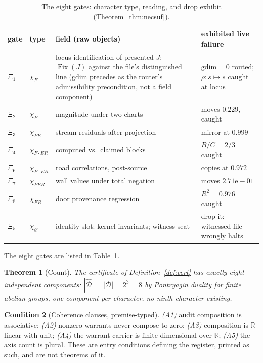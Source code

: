 \documentclass[twocolumn,10pt]{article}
\theoremstyle{plain}
\newtheorem{theorem}{Theorem}[section]
\theoremstyle{definition}
\newtheorem{condition}[theorem]{Condition}
\newcommand{\Rl}{\mathbb{R}}
\begin{document}
\begin{table}[t]\centering\small
\begin{tabular}{@{}llp{6.4cm}p{4.2cm}@{}}
\toprule
gate & type & field (raw objects) & exhibited live failure\\
\midrule
$\Xi_1$ & $\chi_F$ & locus identification of presented $J$: $\operatorname{Fix}(J)$ against the file's distinguished line ($\mathrm{gdim}$ precedes as the router's admissibility precondition, not a field component) & $\mathrm{gdim}=0$ routed; $\rho\colon s\mapsto\bar s$ caught at locus\\
$\Xi_2$ & $\chi_E$ & magnitude under two charts & moves $0.229$, caught\\
$\Xi_3$ & $\chi_{FE}$ & stream residuals after projection & mirror at $0.999$\\
$\Xi_4$ & $\chi_{F\cdot ER}$ & computed vs.\ claimed blocks & $B/C=2/3$ caught\\
$\Xi_6$ & $\chi_{E\cdot ER}$ & road correlations, post-source & copies at $0.972$\\
$\Xi_7$ & $\chi_{FER}$ & wall values under total negation & moves $2.71\mathrm{e}{-}01$\\
$\Xi_8$ & $\chi_{ER}$ & door provenance regression & $R^2=0.976$ caught\\
$\Xi_5$ & $\chi_\varnothing$ & identity slot: kernel invariants; witness seat & drop it: witnessed file wrongly halts\\
\bottomrule
\end{tabular}
\caption{The eight gates: character type, reading, and drop exhibit (Theorem~\ref{thm:necsuf}).}\label{tab:gates}
\end{table}

The eight gates are listed in Table~\ref{tab:gates}.

\begin{theorem}[Count]\label{thm:eight}
The certificate of Definition~\ref{def:cert} has exactly eight independent components: $|\widehat{\mathcal D}|=|\mathcal D|=2^3=8$ by Pontryagin duality for finite abelian groups, one component per character, no ninth character existing.
\end{theorem}

\begin{condition}[Coherence clauses, premise-typed]\label{cond:clauses}
\emph{(A1)} audit composition is associative; \emph{(A2)} nonzero warrants never compose to zero; \emph{(A3)} composition is $\Rl$-linear with unit; \emph{(A4)} the warrant carrier is finite-dimensional over $\Rl$; \emph{(A5)} the axis count is plural. These are entry conditions defining the register, printed as such, and are not theorems of it.
\end{condition}
\end{document}
